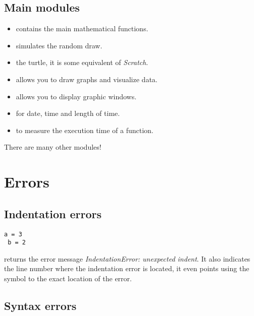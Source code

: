 \documentclass[11pt,class=report,crop=false]{standalone}
\begin{document}
\subsection{Main modules}


\begin{itemize}
  \item {} \quad contains the main mathematical functions. 
  \item {} \quad simulates the random draw.
  \item {}\quad the \Python{} turtle, it is some equivalent of \emph{Scratch}.
  \item {} \quad allows you to draw graphs and visualize data.
  \item {} \quad allows you to display graphic windows.
  \item {} \quad for date, time and length of time.
  \item {} \quad to measure the execution time of a function.
\end{itemize}

There are many other modules!



\section{Errors}

\subsection{Indentation errors}

\begin{lstlisting}
a = 3
 b = 2
\end{lstlisting}

\Python{} returns the error message \emph{IndentationError: unexpected indent}.
It also indicates the line number where the indentation error is located, it even points using the symbol \og{}\ci{\^}\fg{} to the exact location of the error.

\subsection{Syntax errors}
\end{document}
